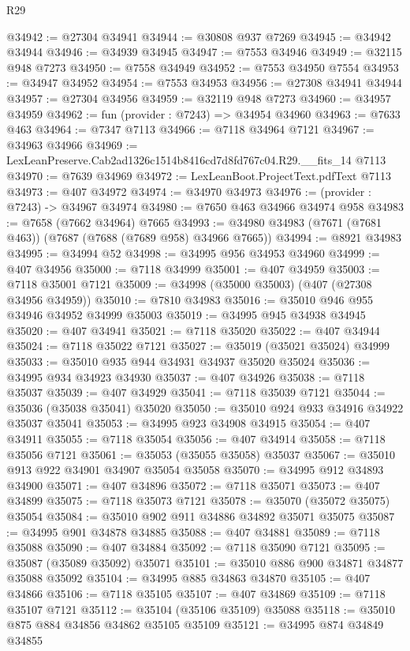 \begin{lexlean}{R29}
\begin{coremodule}
@34942 := @27304 @34941
@34944 := @30808 @937 @7269
@34945 := @34942 @34944
@34946 := @34939 @34945
@34947 := @7553 @34946
@34949 := @32115 @948 @7273
@34950 := @7558 @34949
@34952 := @7553 @34950 @7554
@34953 := @34947 @34952
@34954 := @7553 @34953
@34956 := @27308 @34941 @34944
@34957 := @27304 @34956
@34959 := @32119 @948 @7273
@34960 := @34957 @34959
@34962 := fun (provider : @7243) => @34954 @34960
@34963 := @7633 @463
@34964 := @7347 @7113
@34966 := @7118 @34964 @7121
@34967 := @34963 @34966
@34969 := LexLeanPreserve.Cab2ad1326c1514b8416cd7d8fd767c04.R29.__fits_14 @7113
@34970 := @7639 @34969
@34972 := LexLeanBoot.ProjectText.pdfText @7113
@34973 := @407 @34972
@34974 := @34970 @34973
@34976 := (provider : @7243) -> @34967 @34974
@34980 := @7650 @463 @34966 @34974 @958
@34983 := @7658 (@7662 @34964) @7665
@34993 := @34980 @34983 (@7671 (@7681 @463)) (@7687 (@7688 (@7689 @958) @34966 @7665))
@34994 := @8921 @34983
@34995 := @34994 @52
@34998 := @34995 @956 @34953 @34960
@34999 := @407 @34956
@35000 := @7118 @34999
@35001 := @407 @34959
@35003 := @7118 @35001 @7121
@35009 := @34998 (@35000 @35003) (@407 (@27308 @34956 @34959))
@35010 := @7810 @34983
@35016 := @35010 @946 @955 @34946 @34952 @34999 @35003
@35019 := @34995 @945 @34938 @34945
@35020 := @407 @34941
@35021 := @7118 @35020
@35022 := @407 @34944
@35024 := @7118 @35022 @7121
@35027 := @35019 (@35021 @35024) @34999
@35033 := @35010 @935 @944 @34931 @34937 @35020 @35024
@35036 := @34995 @934 @34923 @34930
@35037 := @407 @34926
@35038 := @7118 @35037
@35039 := @407 @34929
@35041 := @7118 @35039 @7121
@35044 := @35036 (@35038 @35041) @35020
@35050 := @35010 @924 @933 @34916 @34922 @35037 @35041
@35053 := @34995 @923 @34908 @34915
@35054 := @407 @34911
@35055 := @7118 @35054
@35056 := @407 @34914
@35058 := @7118 @35056 @7121
@35061 := @35053 (@35055 @35058) @35037
@35067 := @35010 @913 @922 @34901 @34907 @35054 @35058
@35070 := @34995 @912 @34893 @34900
@35071 := @407 @34896
@35072 := @7118 @35071
@35073 := @407 @34899
@35075 := @7118 @35073 @7121
@35078 := @35070 (@35072 @35075) @35054
@35084 := @35010 @902 @911 @34886 @34892 @35071 @35075
@35087 := @34995 @901 @34878 @34885
@35088 := @407 @34881
@35089 := @7118 @35088
@35090 := @407 @34884
@35092 := @7118 @35090 @7121
@35095 := @35087 (@35089 @35092) @35071
@35101 := @35010 @886 @900 @34871 @34877 @35088 @35092
@35104 := @34995 @885 @34863 @34870
@35105 := @407 @34866
@35106 := @7118 @35105
@35107 := @407 @34869
@35109 := @7118 @35107 @7121
@35112 := @35104 (@35106 @35109) @35088
@35118 := @35010 @875 @884 @34856 @34862 @35105 @35109
@35121 := @34995 @874 @34849 @34855

\end{coremodule}
\end{lexlean}
